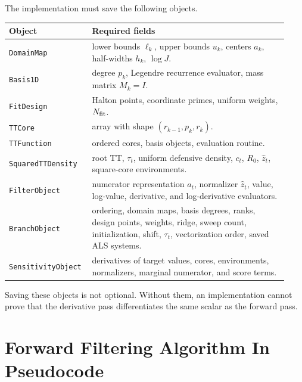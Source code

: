 \documentclass[11pt]{article}
\theoremstyle{definition}
\theoremstyle{remark}
\renewcommand{\[}{\begin{equation}}
\renewcommand{\]}{\end{equation}}
\begin{document}
The implementation must save the following objects.

\begin{longtable}{p{0.25\linewidth}p{0.68\linewidth}}
\toprule
Object & Required fields \\
\midrule
\texttt{DomainMap} & lower bounds \(\ell_k\), upper bounds \(u_k\), centers
\(a_k\), half-widths \(h_k\), \(\log J\).\\
\texttt{Basis1D} & degree \(p_k\), Legendre recurrence evaluator, mass matrix
\(M_k=I\).\\
\texttt{FitDesign} & Halton points, coordinate primes, uniform weights,
\(N_{\rm fit}\).\\
\texttt{TTCore} & array with shape \((r_{k-1},p_k,r_k)\).\\
\texttt{TTFunction} & ordered cores, basis objects, evaluation routine.\\
\texttt{SquaredTTDensity} & root TT, \(\tau_t\), uniform defensive density,
\(c_t\), \(R_0\), \(\widehat z_t\), square-core environments.\\
\texttt{FilterObject} & numerator representation \(a_t\), normalizer
\(\widehat z_t\), value, log-value, derivative, and log-derivative evaluators.\\
\texttt{BranchObject} & ordering, domain maps, basis degrees, ranks, design
points, weights, ridge, sweep count, initialization, shift, \(\tau_t\),
vectorization order, saved ALS systems.\\
\texttt{SensitivityObject} & derivatives of target values, cores, environments,
normalizers, marginal numerator, and score terms.\\
\bottomrule
\end{longtable}

Saving these objects is not optional.  Without them, an implementation cannot
prove that the derivative pass differentiates the same scalar as the forward
pass.

\section{Forward Filtering Algorithm In Pseudocode}
\end{document}
